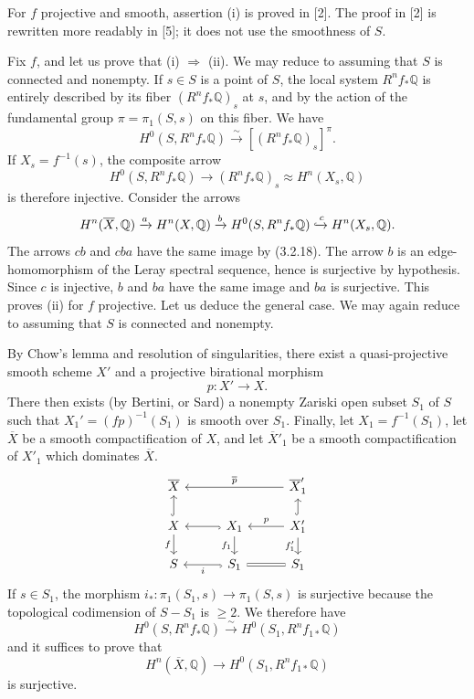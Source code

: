 \documentclass[10pt]{article}
\newcommand{\Q}{\mathbb Q}
\newcommand{\fg}{\guillemotright}
\newcommand{\og}{\guillemotleft}
\begin{document}
For $f$ projective and smooth, assertion (i) is proved in [2]. The proof in [2] is rewritten more readably in [5]; it does not use the smoothness of $S$.

Fix $f$, and let us prove that (i) $\Rightarrow$ (ii). We may reduce to assuming that $S$ is connected and nonempty. If $s\in S$ is a point of $S$, the local system $R^nf_*\Q$ is entirely described by its fiber $(R^nf_*\Q)_s$ at $s$, and by the action of the fundamental group $\pi=\pi_1(S,s)$ on this fiber. We have
\[
H^0(S,R^nf_*\Q)\xrightarrow{\sim}[(R^nf_*\Q)_s]^\pi.
\]
If $X_s=f^{-1}(s)$, the composite arrow
\[
H^0(S,R^nf_*\Q)\longrightarrow (R^nf_*\Q)_s\approx H^n(X_s,\Q)
\]
is therefore injective. Consider the arrows
\[
H^n(\overline X,\Q)\xrightarrow{a}H^n(X,\Q)\xrightarrow{b}
H^0(S,R^nf_*\Q)\xhookrightarrow{c}H^n(X_s,\Q).
\]
The arrows $cb$ and $cba$ have the same image by (3.2.18). The arrow $b$ is an \og edge-homomorphism\fg{} of the Leray spectral sequence, hence is surjective by hypothesis. Since $c$ is injective, $b$ and $ba$ have the same image and $ba$ is surjective. This proves (ii) for $f$ projective. Let us deduce the general case. We may again reduce to assuming that $S$ is connected and nonempty.

By Chow's lemma and resolution of singularities, there exist a
quasi-projective smooth scheme $X'$ and a projective birational morphism
\[
p:X'\longrightarrow X.
\]
There then exists (by Bertini, or Sard) a nonempty Zariski open subset $S_1$ of $S$ such that $X_1'=(fp)^{-1}(S_1)$ is smooth over $S_1$. Finally, let $X_1=f^{-1}(S_1)$, let $\overline X$ be a smooth compactification of $X$, and let $\overline X'_1$ be a smooth compactification of $X'_1$ which dominates $\overline X$.
\[
\begin{tikzcd}[row sep=1.35em,column sep=2.8em]
\overline X && \overline X'_1 \arrow[ll,"\overline p"']\\
X \arrow[u,hook] \arrow[d,"f"'] & X_1 \arrow[l,hook] \arrow[d,"f_1"'] & X'_1 \arrow[l,"p"'] \arrow[u,hook] \arrow[d,"f'_1"']\\
S & S_1 \arrow[l,hook,"i"] & S_1 \arrow[l,equal]
\end{tikzcd}
\]
If $s\in S_1$, the morphism $i_*:\pi_1(S_1,s)\to\pi_1(S,s)$ is surjective because the topological codimension of $S-S_1$ is $\ge2$. We therefore have
\[
H^0(S,R^nf_*\Q)\xrightarrow{\sim} H^0(S_1,R^nf_{1*}\Q)
\]
and it suffices to prove that
\[
H^n(\overline X,\Q)\longrightarrow H^0(S_1,R^nf_{1*}\Q)
\]
is surjective.
\end{document}
